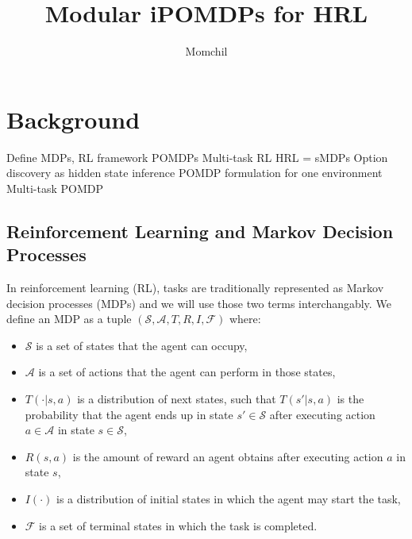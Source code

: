 \documentclass[11pt]{article}
\title{Modular iPOMDPs for HRL}
\author{Momchil}
\begin{document}
\maketitle






\section{Background} 

Define MDPs, RL framework
POMDPs
Multi-task RL
HRL = sMDPs
Option discovery as hidden state inference
POMDP formulation for one environment
Multi-task POMDP

\subsection{Reinforcement Learning and Markov Decision Processes}

In reinforcement learning (RL), tasks are traditionally represented as Markov decision processes (MDPs) \cite{Sutton1998} and we will use those two terms interchangably. We define an MDP as a tuple $(\mathcal{S}, \mathcal{A}, T, R, I, \mathcal{F})$ where:
\begin{itemize}
\item $\mathcal{S}$ is a set of states that the agent can occupy,
\item $\mathcal{A}$ is a set of actions that the agent can perform in those states,
\item $T(\cdot|s,a)$ is a distribution of next states, such that $T(s'|s,a)$ is the probability that the agent ends up in state $s' \in \mathcal{S}$ after executing action $a \in \mathcal{A}$ in state $s \in \mathcal{S}$,
\item $R(s,a)$ is the amount of reward an agent obtains after executing action $a$ in state $s$,
\item $I(\cdot)$ is a distribution of initial states in which the agent may start the task,
\item $\mathcal{F}$ is a set of terminal states in which the task is completed.
\end{itemize}
\end{document}
